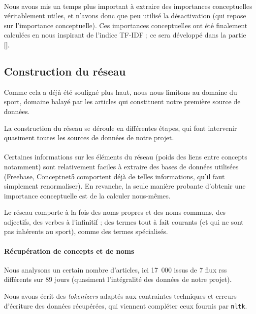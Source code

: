 \documentclass[a4paper, 12pt]{article}
\newcommand{\pyt}[1]{\texttt{#1}}%
\newcommand{\ang}[1]{\textit{#1}}%
\begin{document}
\paragraph{}
Nous avons mis un temps plus important à extraire des importances conceptuelles véritablement utiles, et n'avons donc que peu utilisé la désactivation (qui repose sur l'importance conceptuelle). Ces importances conceptuelles ont été finalement calculées en nous inspirant de l'indice TF-IDF ; ce sera développé dans la partie [].



\subsection{Construction du réseau}
Comme cela a déjà été souligné plus haut, nous nous limitons au domaine du sport, domaine balayé par les articles qui constituent notre première source de données. 

La construction du réseau se déroule en différentes étapes, qui font intervenir quasiment toutes les sources de données de notre projet.


\paragraph{}
Certaines informations sur les éléments du réseau (poids des liens entre concepts notamment) sont relativement faciles à extraire des bases de données utilisées (Freebase, Conceptnet5 comportent déjà de telles informations, qu'il faut simplement renormaliser). En revanche, la seule manière probante d'obtenir une importance conceptuelle est de la calculer nous-mêmes.

Le réseau comporte à la fois des noms propres et des noms communs, des adjectifs, des verbes à l'infinitif ; des termes tout à fait courants (et qui ne sont pas inhérents au sport), comme des termes spécialisés.



\paragraph{Récupération de concepts et de noms}

Nous analysons un certain nombre d'articles, ici 17~000 issus de 7 flux rss différents sur 89 jours (quasiment l'intégralité des données de notre projet).


Nous avons écrit des \ang{tokenizers} adaptés aux contraintes techniques et erreurs d'écriture des données récupérées, qui viennent compléter ceux fournis par \pyt{nltk}.
\end{document}
